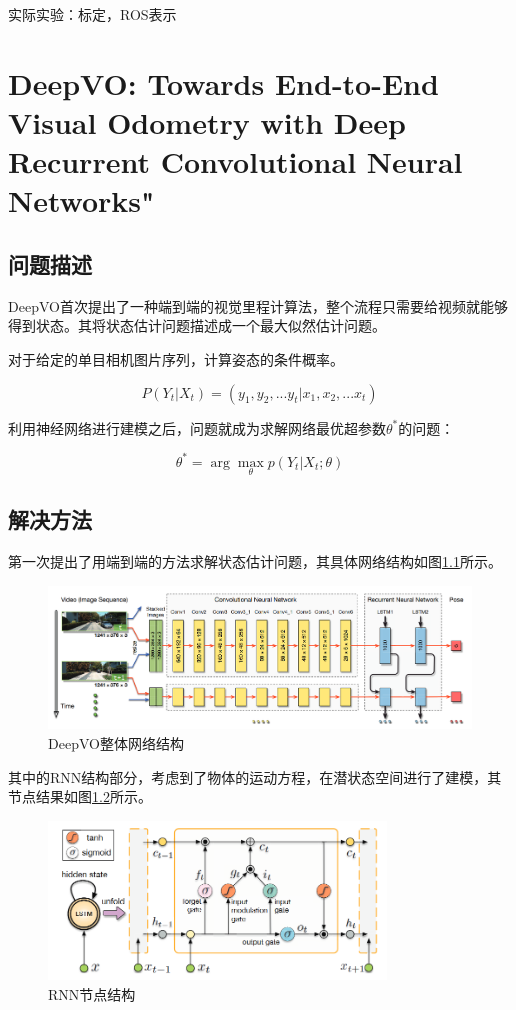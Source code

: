 实际实验：标定，ROS表示


\chapter{DeepVO: Towards End-to-End Visual Odometry with Deep Recurrent Convolutional Neural Networks"\cite{wang_deepvo_nodate}}

\section{问题描述}

DeepVO首次提出了一种端到端的视觉里程计算法，整个流程只需要给视频就能够得到状态。其将状态估计问题描述成一个最大似然估计问题。

\begin{tcolorbox}[]
	对于给定的单目相机图片序列，计算姿态的条件概率。
	
	$$P(Y_t|X_t) = (y_1,y_2,...y_t|x_1,x_2,...x_t)$$
	
	利用神经网络进行建模之后，问题就成为求解网络最优超参数$\theta^*$的问题：
	
	$$\theta^{*} = \arg\max_{\theta} p(Y_{t}|X_{t}; \theta)$$
\end{tcolorbox}

\section{解决方法}
第一次提出了用端到端的方法求解状态估计问题，其具体网络结构如图\ref{deepvo1}所示。

\begin{figure}[H]
	\centering
	\includegraphics[width=\textwidth]{images/deepvo1.png}
	\caption{DeepVO整体网络结构}
	\label{deepvo1}
\end{figure}

其中的RNN结构部分，考虑到了物体的运动方程，在潜状态空间进行了建模，其节点结果如图\ref{rnn_point}所示。
\begin{figure}[H]
	\centering
	\includegraphics[width=0.8\textwidth]{images/deepvo/rnn_point.png}
	\caption{RNN节点结构}
	\label{rnn_point}
\end{figure}

